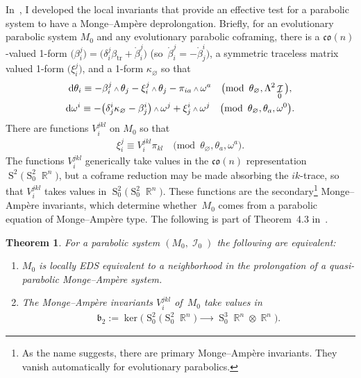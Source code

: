 \documentclass[10pt,a4paper]{amsart}
\DeclareMathOperator{\R}{\mathbb{R}}
\DeclareMathOperator{\Sym}{S}
\DeclareMathOperator{\tr}{tr}
\DeclareMathOperator{\I}{\mathcal{I}}
\renewcommand{\d}{{\rm d}}
\renewcommand{\mod}[1]{\quad\big(\mathrm{mod\enspace} #1\big)}
\newcommand{\w}{{\mathchoice{\,{\scriptstyle\wedge}\,}{{\scriptstyle\wedge}}
 {{\scriptscriptstyle\wedge}}{{\scriptscriptstyle\wedge}}}}
\newcommand{\thetas}[1]{\theta_{#1}}
\newcommand{\pis}[1]{\pi_{#1}}
\numberwithin{equation}{section}
\newtheorem{Theorem}{Theorem}[section]
\begin{document}
In~\cite{McMillan:ParabolicsI}, I developed the local invariants that provide an effective test for a parabolic system to have a Monge--Amp\`ere deprolongation. Briefly, for an evolutionary parabolic system $M_0$ and any evolutionary parabolic coframing, there is a $\mathfrak{co}(n)$-valued 1-form $\big(\beta_i^j\big) = \big(\delta_i^j\beta_{\tr} + \mathring{\beta}_i^j\big)$ (so~$\mathring{\beta}_i^j = -\mathring{\beta}_j^i)$, a symmetric traceless matrix valued 1-form $\big(\xi_i^j\big)$, and a 1-form $\kappa_{\varnothing}$ so that
\begin{gather}
 \d\thetas{i} \equiv - \beta_i^j\w\thetas{j} - \xi^j_i\w\thetas{j} - \pis{ia}\w\omega^a \mod{\thetas{\varnothing},\Lambda^2 \I_0}, \nonumber
 \\
 \d\omega^i \equiv -\big(\delta^i_j \kappa_{\varnothing} - \beta^i_j\big)\w\omega^j + \xi^i_j\w\omega^j \mod{\thetas{\varnothing}, \thetas{a}, \omega^0} .\label{eq: evolutionary MA structure equations}
\end{gather}
There are functions $V^{jkl}_i$ on $M_0$ so that
\begin{gather*}
\xi_i^j \equiv V_i^{jkl}\pis{kl} \mod{\thetas{\varnothing}, \thetas{a}, \omega^a } .
\end{gather*}
The functions $V_i^{jkl}$ generically take values in the $\mathfrak{co}(n)$ representation $\Sym^2 \big(\Sym^2_0 \R^n\big)$, but a coframe reduction may be made absorbing the $ik$-trace, so that $V_i^{jkl}$ takes values in $\Sym^2_0 \big(\Sym^2_0 \R^n\big)$. These functions are the secondary\footnote{As the name suggests, there are primary Monge--Amp\`ere invariants. They vanish automatically for evolutionary parabolics.} Monge--Amp\`ere invariants, which determine whether~$M_0$ comes from a parabolic equation of Monge--Amp\`ere type. The following is part of Theorem~4.3 in~\cite{McMillan:ParabolicsI}.
\begin{Theorem}
 For a parabolic system $(M_0,\I_0)$ the following are equivalent:
 \begin{enumerate}\itemsep=0pt
 \item[$1.$] $M_0$ is locally EDS equivalent to a neighborhood in the prolongation of a quasi-parabolic Monge--Amp\`ere system.

 \item[$2.$] The Monge--Amp\`ere invariants $V_i^{jkl}$ of~$M_0$ take values in
 \begin{gather*}
 \mathfrak{b}_2 := \ker\big(\Sym^2_0 \big( \Sym^2_0 \R^n\big) \xrightarrow{\qquad} \Sym_0^3 \R^n \otimes \R^n\big).
 \end{gather*}
 \end{enumerate}
\end{Theorem}
\end{document}
